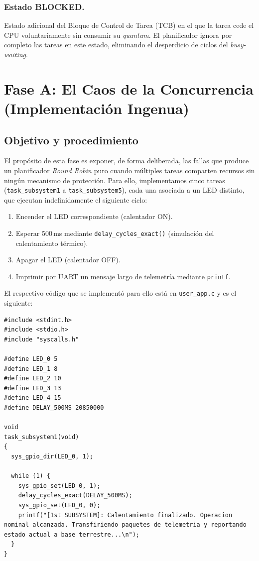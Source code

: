 \documentclass[12pt,letterpaper]{article}
\begin{document}
\subsubsection*{Estado BLOCKED.}
Estado adicional del Bloque de Control de Tarea (TCB) en el que la tarea cede el CPU voluntariamente sin consumir su \textit{quantum}. El planificador ignora por completo las tareas en este estado, eliminando el desperdicio de ciclos del \textit{busy-waiting}.

\newpage

\section*{Fase A: El Caos de la Concurrencia\\ (Implementación Ingenua)}

\subsection*{Objetivo y procedimiento}

El propósito de esta fase es exponer, de forma deliberada, las fallas que produce un planificador \textit{Round Robin} puro cuando múltiples tareas comparten recursos sin ningún mecanismo de protección. Para ello, implementamos cinco tareas (\texttt{task\_subsystem1} a \texttt{task\_subsystem5}), cada una asociada a un LED distinto, que ejecutan indefinidamente el siguiente ciclo:

\begin{enumerate}
\item Encender el LED correspondiente (calentador ON).
\item Esperar 500\,ms mediante \texttt{delay\_cycles\_exact()} (simulación del calentamiento térmico).
\item Apagar el LED (calentador OFF).
\item Imprimir por UART un mensaje largo de telemetría mediante \texttt{printf}.
\end{enumerate}

\noindent
El respectivo código que se implementó para ello está en \texttt{user\_app.c} y es el siguiente:

\begin{lstlisting}[style=modernc]
#include <stdint.h>
#include <stdio.h>
#include "syscalls.h"

#define LED_0 5
#define LED_1 8
#define LED_2 10
#define LED_3 13
#define LED_4 15
#define DELAY_500MS 20850000

void
task_subsystem1(void)
{
  sys_gpio_dir(LED_0, 1);

  while (1) {
    sys_gpio_set(LED_0, 1);
    delay_cycles_exact(DELAY_500MS);
    sys_gpio_set(LED_0, 0);
    printf("[1st SUBSYSTEM]: Calentamiento finalizado. Operacion nominal alcanzada. Transfiriendo paquetes de telemetria y reportando estado actual a base terrestre...\n");
  }
}
\end{lstlisting}
\end{document}
